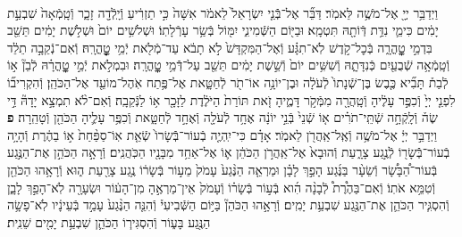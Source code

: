 \documentclass[twoside, openany, parskip=half, 11pt]{book}
\begin{document}
\begin{footnotesize}
\begin{multicols}{2}
\\
וַיְדַבֵּ֥ר יְיָ֖ אֶל־מֹשֶׁ֥ה לֵּאמֹֽר׃ דַּבֵּ֞ר אֶל־בְּֿֿנֵ֤י יִשְׂרָאֵל֙ לֵאמֹ֔ר אִשָּׁה֙ כִּ֣י תַזְרִ֔יעַ וְֿיָֽלְֿדָ֖ה זָכָ֑ר וְֿטָֽמְֿאָה֙ שִׁבְעַ֣ת יָמִ֔ים כִּימֵ֛י נִדַּ֥ת דְּֿוֹתָ֖הּ תִּטְמָֽא׃ וּבַיּ֖וֹם הַשְּֿׁמִינִ֑י יִמּ֖וֹל בְּֿשַׂ֥ר עָרְֿלָתֽוֹ׃ וּשְׁלֹשִׁ֥ים יוֹם֙ וּשְׁלֹ֣שֶׁת יָמִ֔ים תֵּשֵׁ֖ב בִּדְמֵ֣י טׇׇׇׇׇׇׇׇׇׇׇׇָֽהֳרָ֑ה בְּֿכׇל־קֹ֣דֶשׁ לֹֽא־תִגָּ֗ע וְֿאֶל־הַמִּקְדָּשׁ֙ לֹ֣א תָבֹ֔א עַד־מְֿלֹ֖את יְֿמֵ֥י טׇׇׇׇׇׇׇׇׇׇׇׇׇׇָֽהֳרָֽהּ׃  וְֿאִם־נְֿקֵבָ֣ה תֵלֵ֔ד וְֿטָֽמְֿאָ֥ה שְֿׁבֻעַ֖יִם כְּֿנִדָּתָ֑הּ וְֿשִׁשִּׁ֥ים יוֹם֙ וְֿשֵׁ֣שֶׁת יָמִ֔ים תֵּשֵׁ֖ב עַל־דְּֿֿמֵ֥י טׇׇׇׇׇׇׇׇׇׇׇׇׇׇָֽהֳרָֽה׃ וּבִמְלֹ֣את יְֿמֵ֣י טׇׇׇׇׇׇׇׇׇׇׇׇָֽהֳרָ֗הּ לְֿבֵן֘ א֣וֹ לְֿבַת֒ תָּבִ֞יא כֶּ֤בֶשׂ בֶּן־שְֿׁנָתוֹ֙ לְֿעֹלָ֔ה וּבֶן־יוֹנָ֥ה אוֹ־תֹ֖ר לְֿחַטָּ֑את אֶל־פֶּ֥תַח אֹֽהֶל־מוֹעֵ֖ד אֶל־הַכֹּהֵֽן׃ וְֿהִקְרִיב֞וֹ לִפְנֵ֤י יְיָ֙ וְֿכִפֶּ֣ר עָלֶ֔יהָ וְֿטָֽהֲרָ֖ה מִמְּֿקֹ֣ר דָּמֶ֑יהָ זֹ֤את תּוֹרַת֙ הַיֹּלֶ֔דֶת לַזָּכָ֖ר א֥וֹ לַנְּֿקֵבָֽה׃ וְֿאִם־לֹ֨א תִמְצָ֣א יָדָהּ֘ דֵּ֣י שֶׂה֒ וְֿלָֽקְֿחָ֣ה שְֿׁתֵּֽי־תֹרִ֗ים א֤וֹ שְֿׁנֵי֙ בְּֿנֵ֣י יוֹנָ֔ה אֶחָ֥ד לְֿעֹלָ֖ה וְֿאֶחָ֣ד לְֿחַטָּ֑את וְֿכִפֶּ֥ר עָלֶ֛יהָ הַכֹּהֵ֖ן וְֿטָהֵֽרָה׃ \textbf{פ}
וַיְדַבֵּ֣ר יְיָ֔ אֶל־מֹשֶׁ֥ה וְֿאֶֽל־אַֽהֲרֹ֖ן לֵאמֹֽר׃ אָדָ֗ם כִּי־יִֽהְיֶ֤ה בְֿעוֹר־בְּֿֿשָׂרוֹ֙ שְֿׂאֵ֤ת אֽוֹ־סַפַּ֨חַת֙ א֣וֹ בַהֶ֔רֶת וְֿהָיָ֥ה בְֿעוֹר־בְּֿֿשָׂר֖וֹ לְֿנֶ֣גַע צָרָ֑עַת וְֿהוּבָא֙ אֶל־אַֽהֲרֹ֣ן הַכֹּהֵ֔ן א֛וֹ אֶל־אַחַ֥ד מִבָּנָ֖יו הַכֹּֽהֲנִֽים׃ וְֿרָאָ֣ה הַכֹּהֵ֣ן אֶת־הַנֶּ֣גַע בְּֿעוֹר־הַ֠בָּשָׂ֠ר וְֿשֵׂעָ֨ר בַּנֶּ֜גַע הָפַ֣ךְ לָבָ֗ן וּמַרְאֵ֤ה הַנֶּ֨גַע֙ עָמֹק֙ מֵע֣וֹר בְּֿשָׂר֔וֹ נֶ֥גַע צָרַ֖עַת ה֑וּא וְֿרָאָ֥הוּ הַכֹּהֵ֖ן וְֿטִמֵּ֥א אֹתֽוֹ׃ וְֿאִם־בַּהֶ֩רֶת֩ לְֿבָנָ֨ה הִ֜וא בְּֿע֣וֹר בְּֿשָׂר֗וֹ וְֿעָמֹק֙ אֵין־מַרְאֶ֣הָ מִן־הָע֔וֹר וּשְׂעָרָ֖ה לֹֽא־הָפַ֣ךְ לָבָ֑ן וְֿהִסְגִּ֧יר הַכֹּהֵ֛ן אֶת־הַנֶּ֖גַע שִׁבְעַ֥ת יָמִֽים׃ וְֿרָאָ֣הוּ הַכֹּהֵן֘ בַּיּ֣וֹם הַשְּֿׁבִיעִי֒ וְֿהִנֵּ֤ה הַנֶּ֨גַע֙ עָמַ֣ד בְּֿעֵינָ֔יו לֹֽא־פָשָׂ֥ה הַנֶּ֖גַע בָּע֑וֹר וְֿהִסְגִּיר֧וֹ הַכֹּהֵ֛ן שִׁבְעַ֥ת יָמִ֖ים שֵׁנִֽית׃


\end{multicols}
\end{footnotesize}
\end{document}
